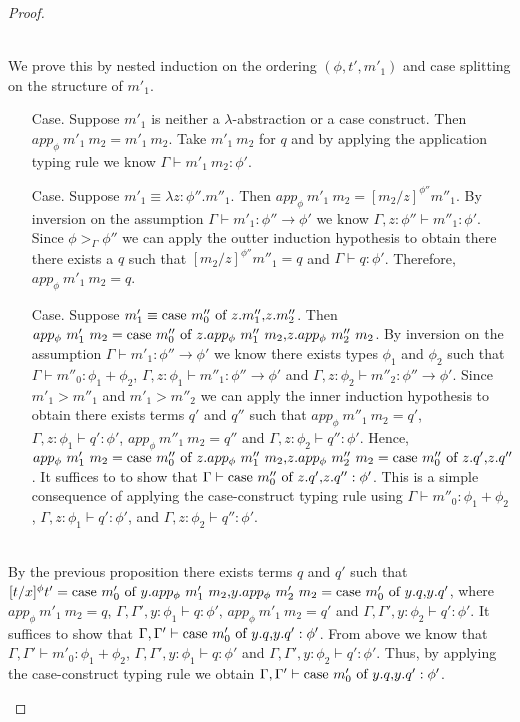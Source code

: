 \begin{proof}
\begin{itemize}
  \ \\
  We prove this by nested induction on the ordering $(\phi, t', m'_1)$ and case splitting on 
  the structure of $m'_1$.
  \begin{itemize}
  \item[Case.] Suppose $m'_1$ is neither a $\lambda$-abstraction or a case construct.  Then
    $app_\phi\  m'_1\ m_2 = m'_1\ m_2$.  Take $m'_1\ m_2$ for $q$ and by applying the application typing rule
    we know $\Gamma \vdash m'_1\ m_2:\phi'$.
    
  \item[Case.] Suppose $m'_1 \equiv \lambda z:\phi''.m''_1$.  Then $app_\phi\ m'_1\ m_2 = [m_2/z]^{\phi''} m''_1$.
    By inversion on the assumption $\Gamma \vdash m'_1:\phi'' \to \phi'$ we know 
    $\Gamma,z:\phi'' \vdash m''_1:\phi'$.  Since $\phi >_{\Gamma} \phi''$ we can apply the outter induction
    hypothesis to obtain there there exists a $q$ such that $[m_2/z]^{\phi''} m''_1 = q$ and 
    $\Gamma \vdash q:\phi'$.  Therefore, $app_\phi\ m'_1\ m_2 = q$.
    
  \item[Case.] Suppose $m'_1 \equiv \mbox{case}\ m''_0\ \text{of}\ z\text{.}m''_1\text{,}z\text{.}m''_2$.  Then\\
    $app_\phi\ m'_1\ m_2 = \mbox{case}\ m''_0\ \text{of}\ z\text{.}app_\phi\ m''_1\ m_2\text{,}z\text{.}app_\phi\ m''_2\ m_2$.  By inversion on the assumption
    $\Gamma \vdash m'_1:\phi''\to\phi'$ we know there exists types $\phi_1$ and $\phi_2$ such that
    $\Gamma \vdash m''_0:\phi_1+\phi_2$, $\Gamma,z:\phi_1 \vdash m''_1:\phi''\to\phi'$
    and $\Gamma,z:\phi_2 \vdash m''_2:\phi''\to\phi'$.  Since $m'_1 > m''_1$ and $m'_1 > m''_2$ we can 
    apply the inner induction hypothesis to obtain there exists terms $q'$ and $q''$ such that 
    $app_\phi\ m''_1\ m_2 = q'$, $\Gamma,z:\phi_1 \vdash q':\phi'$, $app_\phi\ m''_1\ m_2 = q''$ and $\Gamma,z:\phi_2 \vdash q'':\phi'$.  
    Hence, 
    $app_\phi\ m'_1\ m_2 = \mbox{case}\ m''_0\ \text{of}\ z\text{.}app_\phi\ m''_1\ m_2\text{,}z\text{.}app_\phi\ m''_2\ m_2 = \mbox{case}\ m''_0\ \text{of}\ z\text{.}q'\text{,}z\text{.}q''$.  It suffices to 
    to show that $\Gamma \vdash \mbox{case}\ m''_0\ \text{of}\ z\text{.}q'\text{,}z\text{.}q'':\phi'$.  This is a simple consequence of applying the
    case-construct typing rule using $\Gamma \vdash m''_0:\phi_1+\phi_2$, $\Gamma,z:\phi_1 \vdash q':\phi'$, and
    $\Gamma,z:\phi_2 \vdash q'':\phi'$.        
  \end{itemize}

   
  \ \\
  By the previous proposition there exists terms $q$ and $q'$ such that \\
  $[t/x]^\phi t' = \ccon{m'_0}{y}{app_\phi\ m'_1\ m_2}{app_\phi\ m'_2\ m_2}
  = \ccon{m'_0}{y}{q}{q'}$, where $app_\phi\ m'_1\ m_2 = q$, $\Gamma,\Gamma',y:\phi_1 \vdash q:\phi'$, $app_\phi\ m'_1\ m_2 = q'$
  and $\Gamma,\Gamma',y:\phi_2 \vdash q':\phi'$.  It suffices to show that
  $\Gamma, \Gamma' \vdash \mbox{case}\ m'_0\ \text{of}\ y\text{.}q\text{,}y\text{.}q':\phi'$.  From above we know that $\Gamma,\Gamma' \vdash m'_0:\phi_1+\phi_2$, 
  $\Gamma,\Gamma',y:\phi_1 \vdash q:\phi'$ and $\Gamma,\Gamma',y:\phi_2 \vdash q':\phi'$.  Thus,
  by applying the case-construct typing rule we obtain $\Gamma, \Gamma' \vdash \mbox{case}\ m'_0\ \text{of}\ y\text{.}q\text{,}y\text{.}q':\phi'$.
  

\end{itemize}
\end{proof}
